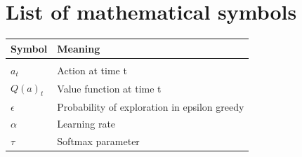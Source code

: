 \documentclass[12pt,a4paper,bibliography=totocnumbered,listof=totocnumbered]{scrartcl}
\begin{document}
\setcounter{page}{1}


	\tableofcontents


\pagebreak


	\listoffigures
	
	
\pagebreak


	\listoftables
	

\pagebreak

\renewcommand{\lstlistlistingname}{List of Listings}
{\lstlistoflistings}
\pagebreak


\renewcommand{\arraystretch}{1.5}	
\section{List of mathematical symbols}

\begin{tabular}{p{6cm}p{9cm}}
\textbf{Symbol} 		& 		\textbf{Meaning} \\
\midrule
\vspace{0.3cm} & \vspace{0.3cm} 			\\
$a_t$				  & Action at time t			\\
$Q(a)_t$	& Value function at time t \\
$\epsilon$			& Probability of exploration in epsilon greedy \\
$\alpha$ & Learning rate \\ 
$\tau$ & Softmax parameter \\
\end{tabular}
\end{document}
